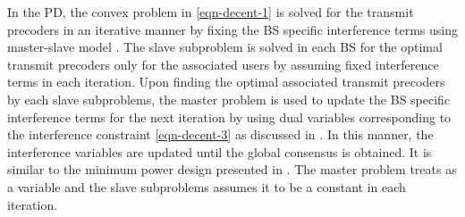 In the \acl{PD}, the convex problem in \eqref{eqn-decent-1} is solved for the transmit precoders in an iterative manner by fixing the \ac{BS} specific interference terms  using master-slave model \cite{pennanen2011decentralized}. The slave subproblem is solved in each \ac{BS} for the optimal transmit precoders only for the associated users by assuming fixed interference terms  in each  iteration. Upon finding the optimal associated transmit precoders by each slave subproblems, the master problem is used to update the \ac{BS} specific interference terms  for the next iteration by using dual variables corresponding to the interference constraint \eqref{eqn-decent-3} as discussed in \cite{pennanen2011decentralized}. In this manner, the interference variables are updated until the global consensus is obtained. It is similar to the minimum power design presented in \cite{pennanen2011decentralized}. The master problem treats  as a variable and the slave subproblems assumes it to be a constant in each iteration. 

\begin{comment}
The \acl{PD} approach decomposes the problem by fixing the interference variables \me{\zeta_{l,k,n,b} \forall k,b} in order to perform the precoder design independently across each \ac{BS}. Once the optimal precoders are designed at each \ac{BS} with the fixed interference constraints \eqref{eqn-decent-3}, the dual variables corresponding to the interference constraints are exchanged between the cooperating \acp{BS} in \me{\mc{B}} to update the interference variables \me{\zeta_{l,k,n,b}} for the next iteration until convergence. The primal approach is discussed extensively for the min-power problem in \cite{pennanen2011decentralized} and much of the current work follows similar approach. 

\subsubsection*{Convergence}
The convergence of the primal decomposition is similar to that of the centralized problem if the interference variables \me{\zeta_{l,k,n,b}} are allowed to converge to a stationary point. In practice, we can limit the number of exchanges to \me{J_{\max}} after which the \ac{SCA} update is performed until convergence or for \me{I_{\max}} times. The update of \me{\tilde{p}_{l,k,n}, \tilde{q}_{l,k,n}} and \me{\tilde{\beta}_{l,k,n}} can be made in conjunction with the receiver update \me{\mvec{W}{k,n}}. The receiver update can be made by using the precoded pilot transmission from each user as in \cite{komulainen2013effective}. 
\end{comment}